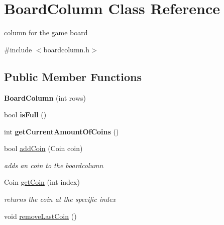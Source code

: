 \hypertarget{class_board_column}{\section{Board\-Column Class Reference}
\label{class_board_column}
}


column for the game board  




{\ttfamily \#include $<$boardcolumn.\-h$>$}

\subsection*{Public Member Functions}
\begin{DoxyCompactItemize}
\item 
\hypertarget{class_board_column_a8f088cd71325ffbdc839c101ca6a4fda}{{\bfseries Board\-Column} (int rows)}\label{class_board_column_a8f088cd71325ffbdc839c101ca6a4fda}

\item 
\hypertarget{class_board_column_adb1521008180835bd37572a1cda02ef8}{bool {\bfseries is\-Full} ()}\label{class_board_column_adb1521008180835bd37572a1cda02ef8}

\item 
\hypertarget{class_board_column_a09589c8bd6912dab8a7fb27500002553}{int {\bfseries get\-Current\-Amount\-Of\-Coins} ()}\label{class_board_column_a09589c8bd6912dab8a7fb27500002553}

\item 
\hypertarget{class_board_column_a060fd86473c5df6a98449e317bc2a364}{bool \hyperlink{class_board_column_a060fd86473c5df6a98449e317bc2a364}{add\-Coin} (Coin coin)}\label{class_board_column_a060fd86473c5df6a98449e317bc2a364}

\begin{DoxyCompactList}\small\item\em adds an coin to the boardcolumn \end{DoxyCompactList}\item 
Coin \hyperlink{class_board_column_a8b8107a2cb462ffd73d484b6e1d9b359}{get\-Coin} (int index)
\begin{DoxyCompactList}\small\item\em returns the coin at the specific index \end{DoxyCompactList}\item 
\hypertarget{class_board_column_ad4b43af3abf8de3332378529b7d5e743}{void \hyperlink{class_board_column_ad4b43af3abf8de3332378529b7d5e743}{remove\-Last\-Coin} ()}\label{class_board_column_ad4b43af3abf8de3332378529b7d5e743}


\end{DoxyCompactItemize}
